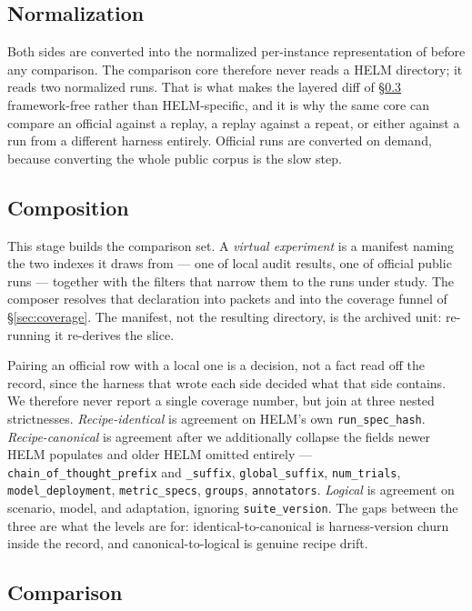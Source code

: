 \subsection{Normalization}
\label{sec:normalization}

Both sides are converted into the normalized per-instance representation of
\citet{eee2026} before any comparison. The comparison core therefore never reads a
HELM directory; it reads two normalized runs. That is what makes the layered diff
of \S\ref{sec:diff} framework-free rather than HELM-specific, and it is why the
same core can compare an official against a replay, a replay against a repeat, or
either against a run from a different harness entirely. Official runs are
converted on demand, because converting the whole public corpus is the slow step.

\subsection{Composition}
\label{sec:composition}

This stage builds the comparison set. A \emph{virtual experiment} is a manifest
naming the two indexes it draws from --- one of local audit results, one of
official public runs --- together with the filters that narrow them to the runs
under study. The composer resolves that declaration into packets and into the
coverage funnel of \S\ref{sec:coverage}. The manifest, not the resulting
directory, is the archived unit: re-running it re-derives the slice.

Pairing an official row with a local one is a decision, not a fact read off the
record, since the harness that wrote each side decided what that side contains. We
therefore never report a single coverage number, but join at three nested
strictnesses. \emph{Recipe-identical} is agreement on HELM's own
\texttt{run\_spec\_hash}. \emph{Recipe-canonical} is agreement after we
additionally collapse the fields newer HELM populates and older HELM omitted
entirely --- \texttt{chain\_of\_thought\_prefix} and \texttt{\_suffix},
\texttt{global\_suffix}, \texttt{num\_trials}, \texttt{model\_deployment},
\texttt{metric\_specs}, \texttt{groups}, \texttt{annotators}. \emph{Logical} is
agreement on scenario, model, and adaptation, ignoring \texttt{suite\_version}.
The gaps between the three are what the levels are for: identical-to-canonical
is harness-version churn inside the record, and canonical-to-logical is genuine
recipe drift.

\subsection{Comparison}
\label{sec:diff}

